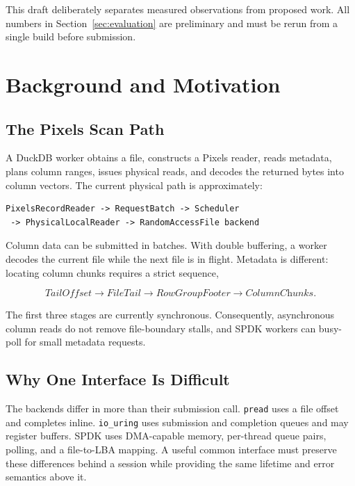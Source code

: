 \documentclass[conference]{IEEEtran}
\begin{document}
This draft deliberately separates measured observations from proposed work.
All numbers in Section~\ref{sec:evaluation} are preliminary and must be rerun
from a single build before submission.

\section{Background and Motivation}

\subsection{The Pixels Scan Path}

A DuckDB worker obtains a file, constructs a Pixels reader, reads metadata,
plans column ranges, issues physical reads, and decodes the returned bytes into
column vectors.  The current physical path is approximately:

\begin{verbatim}
PixelsRecordReader -> RequestBatch -> Scheduler
 -> PhysicalLocalReader -> RandomAccessFile backend
\end{verbatim}

Column data can be submitted in batches.  With double buffering, a worker
decodes the current file while the next file is in flight.  Metadata is
different: locating column chunks requires a strict sequence,

\begin{equation}
\textit{TailOffset} \rightarrow \textit{FileTail}
\rightarrow \textit{RowGroupFooter} \rightarrow \textit{ColumnChunks}.
\end{equation}

The first three stages are currently synchronous.  Consequently, asynchronous
column reads do not remove file-boundary stalls, and SPDK workers can busy-poll
for small metadata requests.

\subsection{Why One Interface Is Difficult}

The backends differ in more than their submission call.  \texttt{pread} uses a
file offset and completes inline.  \texttt{io\_uring} uses submission and
completion queues and may register buffers.  SPDK uses DMA-capable memory,
per-thread queue pairs, polling, and a file-to-LBA mapping.  A useful common
interface must preserve these differences behind a session while providing the
same lifetime and error semantics above it.
\end{document}
